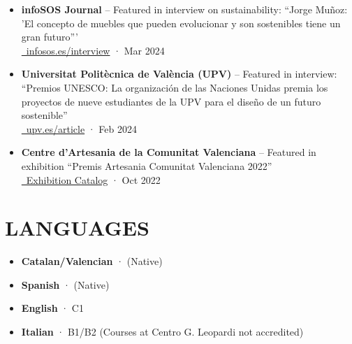 \documentclass[11pt,a4paper]{article}
\begin{document}
\begin{itemize}[leftmargin=*,label={},itemsep=2pt]
    \item \textbf{infoSOS Journal} -- Featured in interview on sustainability: ``Jorge Muñoz: 'El concepto de muebles que pueden evolucionar y son sostenibles tiene un gran futuro'''\\
    \href{https://infosos.es/jorge-munoz-el-concepto-de-muebles-que-pueden-evolucionar-y-son-sostenibles-tiene-un-gran-futuro/}{\faNewspaper[regular]\ infosos.es/interview} · Mar 2024
    
    \item \textbf{Universitat Politècnica de València (UPV)} -- Featured in interview: ``Premios UNESCO: La organización de las Naciones Unidas premia los proyectos de nueve estudiantes de la UPV para el diseño de un futuro sostenible''\\
    \href{https://www.upv.es/noticias-upv/noticia-14469-premios-unesco-es.html}{\faUniversity\ upv.es/article} · Feb 2024
    
    \item \textbf{Centre d'Artesania de la Comunitat Valenciana} -- Featured in exhibition ``Premis Artesania Comunitat Valenciana 2022''\\
    \href{https://www.centroartesaniacv.com/galeria/documentos/1672397676_1.PDF}{\faFilePdf \ Exhibition Catalog} · Oct 2022
\end{itemize}

\section*{LANGUAGES}
\begin{itemize}[leftmargin=*,label={},itemsep=2pt]
    \item \textbf{Catalan/Valencian} · (Native)

    \item \textbf{Spanish} · (Native)
    
    \item \textbf{English} · C1
    
    \item \textbf{Italian} · B1/B2 (Courses at Centro G. Leopardi not accredited)
\end{itemize}

\end{document}
